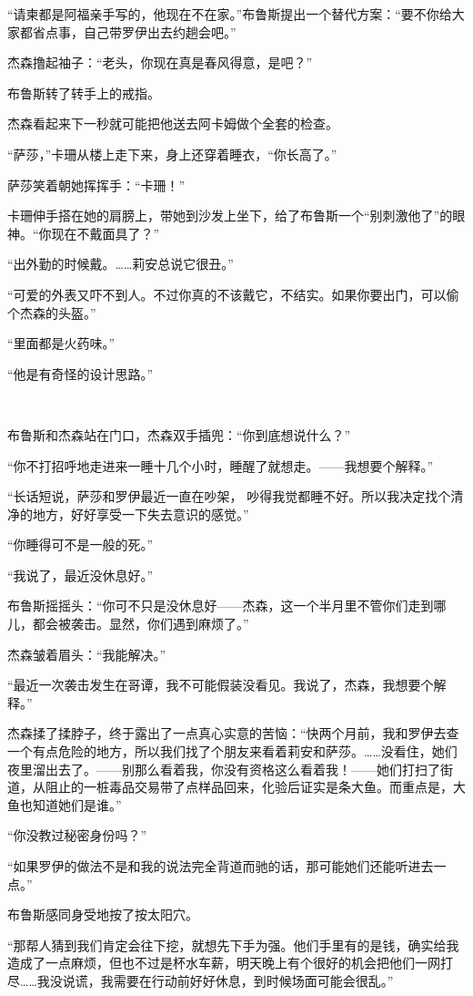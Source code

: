 \documentclass[../main]{subfiles}
\begin{document}
“请柬都是阿福亲手写的，他现在不在家。”布鲁斯提出一个替代方案：“要不你给大家都省点事，自己带罗伊出去约趟会吧。”

杰森撸起袖子：“老头，你现在真是春风得意，是吧？”

布鲁斯转了转手上的戒指。

杰森看起来下一秒就可能把他送去阿卡姆做个全套的检查。

“萨莎，”卡珊从楼上走下来，身上还穿着睡衣，“你长高了。”

萨莎笑着朝她挥挥手：“卡珊！”

卡珊伸手搭在她的肩膀上，带她到沙发上坐下，给了布鲁斯一个“别刺激他了”的眼神。“你现在不戴面具了？”

“出外勤的时候戴。……莉安总说它很丑。”

“可爱的外表又吓不到人。不过你真的不该戴它，不结实。如果你要出门，可以偷个杰森的头盔。”

“里面都是火药味。”

“他是有奇怪的设计思路。”

~\

布鲁斯和杰森站在门口，杰森双手插兜：“你到底想说什么？”

“你不打招呼地走进来一睡十几个小时，睡醒了就想走。——我想要个解释。”

“长话短说，萨莎和罗伊最近一直在吵架，
吵得我觉都睡不好。所以我决定找个清净的地方，好好享受一下失去意识的感觉。”

“你睡得可不是一般的死。”

“我说了，最近没休息好。”

布鲁斯摇摇头：“你可不只是没休息好——杰森，这一个半月里不管你们走到哪儿，都会被袭击。显然，你们遇到麻烦了。”

杰森皱着眉头：“我能解决。”

“最近一次袭击发生在哥谭，我不可能假装没看见。我说了，杰森，我想要个解释。”

杰森揉了揉脖子，终于露出了一点真心实意的苦恼：“快两个月前，我和罗伊去查一个有点危险的地方，所以我们找了个朋友来看着莉安和萨莎。……没看住，她们夜里溜出去了。——别那么看着我，你没有资格这么看着我！——她们打扫了街道，从阻止的一桩毒品交易带了点样品回来，化验后证实是条大鱼。而重点是，大鱼也知道她们是谁。”

“你没教过秘密身份吗？”

“如果罗伊的做法不是和我的说法完全背道而驰的话，那可能她们还能听进去一点。”

布鲁斯感同身受地按了按太阳穴。

“那帮人猜到我们肯定会往下挖，就想先下手为强。他们手里有的是钱，确实给我造成了一点麻烦，但也不过是杯水车薪，明天晚上有个很好的机会把他们一网打尽……我没说谎，我需要在行动前好好休息，到时候场面可能会很乱。”
\end{document}
